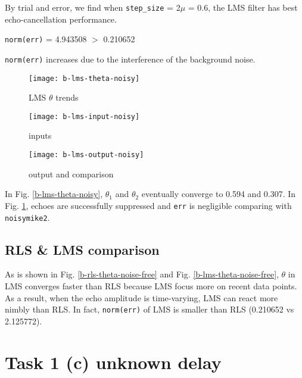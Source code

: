 \documentclass{article}
\begin{document}
By trial and error, we find when \texttt{step\_size} = 2$\mu$ = 0.6, the LMS filter has best echo-cancellation performance.
\begin{center}
\texttt{norm(err)} = 4.943508 $>$ 0.210652
\end{center}
\texttt{norm(err)} increases due to the interference of the background noise.

\begin{figure}[H]
\begin{minipage}[t]{0.33\linewidth}
\centering
\texttt{[image: b-lms-theta-noisy]}
\caption{LMS $\theta$ trends}
\label{b-lms-theta-noisy}
\end{minipage}
\begin{minipage}[t]{0.33\linewidth}
\centering
\texttt{[image: b-lms-input-noisy]}
\caption{inputs}
\end{minipage}
\begin{minipage}[t]{0.33\linewidth}
\centering
\texttt{[image: b-lms-output-noisy]}
\caption{output and comparison}
\label{b-lms-output-noisy}
\end{minipage}
\end{figure}

In Fig. \ref{b-lms-theta-noisy}, $\theta_1$ and $\theta_2$ eventually converge to 0.594 and 0.307. In Fig. \ref{b-lms-output-noisy}, echoes are successfully suppressed and \texttt{err} is negligible comparing with \texttt{noisymike2}.


\subsection*{RLS \& LMS comparison}
As is shown in Fig. \ref{b-rls-theta-noise-free} and Fig. \ref{b-lms-theta-noise-free}, $\theta$ in LMS converges faster than RLS because LMS focus more on recent data points. As a result, when the echo amplitude is time-varying, LMS can react more nimbly than RLS. In fact, \texttt{norm(err)} of LMS is smaller than RLS (0.210652 vs 2.125772).


\section*{Task 1 (c) unknown delay}
\end{document}
